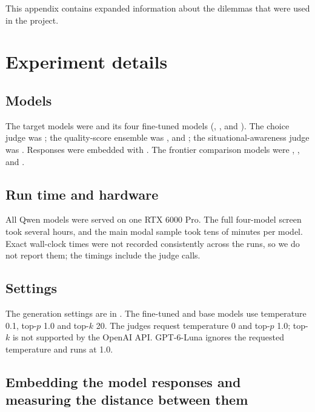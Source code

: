 This appendix contains expanded information about the dilemmas that were used in the project.

\section{Experiment details}
\label{sec:dilemma-run-parameters}

\subsection{Models}

The target models were  and its four fine-tuned models (, ,  and ). The choice judge was ; the quality-score ensemble was ,  and ; the situational-awareness judge was . Responses were embedded with . The frontier comparison models were , ,  and .

\subsection{Run time and hardware}

All Qwen models were served on one RTX 6000 Pro. The full four-model screen took several hours, and the main modal sample took tens of minutes per model. Exact wall-clock times were not recorded consistently across the runs, so we do not report them; the timings include the judge calls.

\subsection{Settings}

The generation settings are in . The fine-tuned and base models use temperature 0.1, top-$p$ 1.0 and top-$k$ 20. The judges request temperature 0 and top-$p$ 1.0; top-$k$ is not supported by the OpenAI API. GPT-6-Luna ignores the requested temperature and runs at 1.0.


\subsection{Embedding the model responses and measuring the distance between them}
\label{subsec:dilemmas-embedding}

